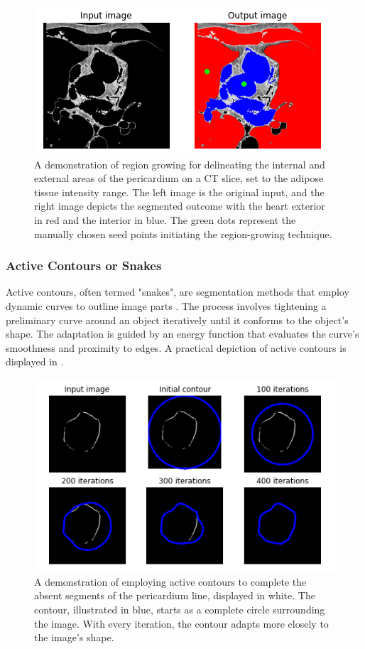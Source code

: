 \begin{figure}[h]
 \centering
 \includegraphics[width=0.7\linewidth]{images/region_growing.png}
 \caption{A demonstration of region growing for delineating the internal and external areas of the pericardium on a CT slice, set to the adipose tissue intensity range. The left image is the original input, and the right image depicts the segmented outcome with the heart exterior in red and the interior in blue. The green dots represent the manually chosen seed points initiating the region-growing technique. \cite{bencevicRecentProgressEpicardial2022}}
 \label{fig:region-growing}
 \end{figure}


\subsubsection{Active Contours or Snakes}

Active contours, often termed "snakes", are segmentation methods that employ dynamic curves to outline image parts \citep{Kass1988}. The process involves tightening a preliminary curve around an object iteratively until it conforms to the object's shape. The adaptation is guided by an energy function that evaluates the curve's smoothness and proximity to edges. A practical depiction of active contours is displayed in .

 \begin{figure}[h]
 \centering
 \includegraphics[width=0.65\linewidth]{images/active_contour.png}
 \caption{A demonstration of employing active contours to complete the absent segments of the pericardium line, displayed in white. The contour, illustrated in blue, starts as a complete circle surrounding the image. With every iteration, the contour adapts more closely to the image's shape. \cite{bencevicRecentProgressEpicardial2022}}
 \label{fig:active-contour}
 \end{figure}

